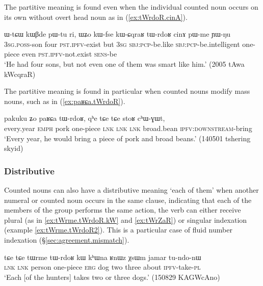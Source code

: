 The partitive meaning is found even when the individual counted noun occurs on its own without overt head noun as in (\ref{ex:tWrdoR.cinA}).

\begin{exe}
	\ex \label{ex:tWrdoR.cinA}
	\gll ɯ-tɕɯ kɯβde pɯ-tu ri, ɯʑo kɯ-fse kɯ-ɕqraʁ tɯ-rdoʁ cinɤ pɯ-me ɲɯ-ŋu 	\\
	\textsc{3sg}.\textsc{poss}-son four \textsc{pst}.\textsc{ipfv}-exist but \textsc{3sg} \textsc{sbj}:\textsc{pcp}-be.like \textsc{sbj}:\textsc{pcp}-be.intelligent one-piece even \textsc{pst}.\textsc{ipfv}-not.exist \textsc{sens}-be \\
	\glt `He had four sons, but not even one of them was smart like him.' (2005 tAwa kWcqraR)
\end{exe} 


The partitive meaning is found in particular when counted nouns modify mass nouns, such as  in (\ref{ex:paʁɕa.tWrdoR}).  

\begin{exe}
	\ex \label{ex:paʁɕa.tWrdoR}
	\gll pakuku ʑo paʁɕa tɯ-rdoʁ, qʰe tɕe tɕe stoʁ cʰɯ-ɣɯt, \\
	every.year \textsc{emph} pork one-piece \textsc{lnk} \textsc{lnk} \textsc{lnk} broad.bean \textsc{ipfv}:\textsc{downstream}-bring \\
	\glt `Every year, he would bring a piece of pork and broad beans.' (140501 tshering skyid)
\end{exe} 

\subsubsection{Distributive} \label{sec:CN.distributive}
 
Counted nouns can also have a distributive meaning  `each of them' when another numeral or counted noun occurs in the same clause, indicating that each of the members of the group performs the same action, the verb can either receive plural (as in \ref{ex:tWrme.tWrdoR.kW} and \ref{ex:tWrZaR}) or singular indexation (example \ref{ex:tWrme.tWrdoR2}). This is a particular case of fluid number indexation (§\ref{sec:agreement.mismatch}).

\begin{exe}
	\ex \label{ex:tWrme.tWrdoR.kW}
	\gll  tɕe tɕe tɯrme tɯ-rdoʁ kɯ kʰɯna ʁnɯz χsɯm jamar tu-ndo-nɯ \\
	\textsc{lnk} \textsc{lnk}  person one-piece \textsc{erg} dog two three about \textsc{ipfv}-take-\textsc{pl} \\
	\glt `Each [of the hunters] takes two or three dogs.' (150829 KAGWcAno)
\end{exe} 

